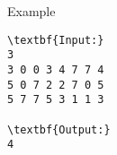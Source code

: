 Example
\begin{verbatim}
\textbf{Input:}
3
3 0 0 3 4 7 7 4 
5 0 7 2 2 7 0 5 
5 7 7 5 3 1 1 3

\textbf{Output:}
4\end{verbatim}